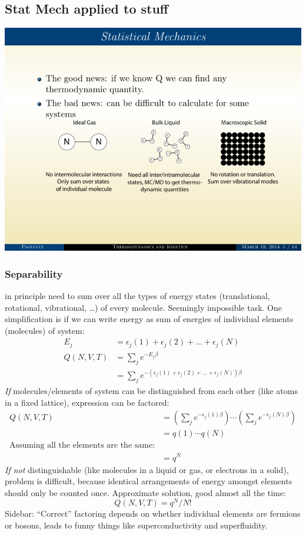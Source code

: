 \documentclass[11pt]{article}
\begin{document}
\subsection{Stat Mech applied to stuff}
\label{sec:org09a096e}
\begin{center}
\includegraphics[width=.9\linewidth]{./Images/gls.pdf}
\end{center}

\subsubsection{Separability}
\label{sec:org804c1c0}

in principle need to sum over all the types of energy states (translational,
rotational, vibrational, \ldots{}) of every molecule.  Seemingly impossible task.
One simplification is if we can write energy as sum of energies of individual
elements (molecules) of system:
\begin{align}
  E_j&=\epsilon_j(1)+\epsilon_j(2) + ... + \epsilon_j(N) \\
  Q(N,V,T) &= \sum_j e^{-E_j\beta} \\
  &=\sum_je^{-(\epsilon_j(1)+\epsilon_j(2) + ... + \epsilon_j(N))\beta}
\end{align}
\emph{If} molecules/elements of system can be distinguished from each
        other (like atoms in a fixed lattice), expression can be factored:
  \begin{align}
    Q(N,V,T)&=\left ( \sum_j e^{-\epsilon_j(1)\beta}\right )\cdots \left ( \sum_j
      e^{-\epsilon_j(N)\beta}\right ) \\
  &= q(1)\cdots q(N) \\
  \text{Assuming all the elements are the same:}\\
  &= q^N
\end{align}
\emph{If not} distinguishable (like molecules in a liquid or gas, or
      electrons in a solid), problem is difficult, because identical
      arrangements of energy amongst elements should only be counted once.
      Approximate solution, good almost all the time:
\begin{equation}
  Q(N,V,T)=q^N/N!
\end{equation}
Sidebar: ``Correct'' factoring depends on whether individual elements
     are fermions or bosons, leads to funny things like superconductivity and
     superfluidity.
\end{document}
